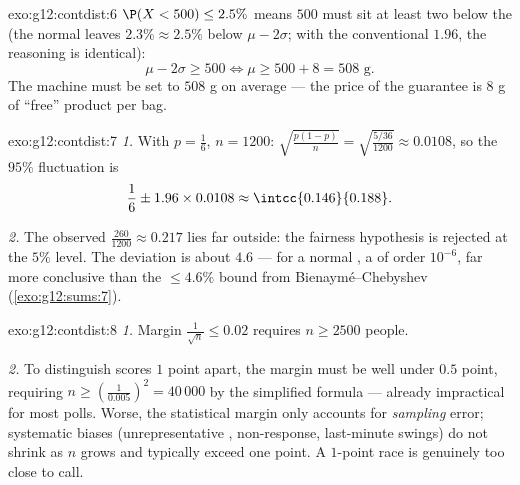 \begin{solution}{exo:g12:contdist:6}
$\P(X < 500) \leq 2.5\%$ means $500$ must sit at least two  below the  (the normal leaves $2.3\% \approx 2.5\%$ below
$\mu - 2\sigma$; with the conventional $1.96$, the reasoning is identical):
\[
\mu - 2\sigma \geq 500 \iff \mu \geq 500 + 8 = 508 \text{ g}.
\]
The machine must be set to $508$ g on average --- the price of the
guarantee is $8$ g of ``free'' product per bag.
\end{solution}

\begin{solution}{exo:g12:contdist:7}
\emph{1.} With $p = \frac16$, $n = 1200$:
$\sqrt{\frac{p(1-p)}{n}} = \sqrt{\frac{5/36}{1200}} \approx 0.0108$, so the
$95\%$ fluctuation  is
\[
\frac16 \pm 1.96 \times 0.0108 \approx \intcc{0.146}{0.188}.
\]

\emph{2.} The observed  $\frac{260}{1200} \approx 0.217$ lies far
outside: the fairness hypothesis is rejected at the $5\%$ level. The
deviation is about $4.6$  --- for a normal
, a  of order $10^{-6}$, far more conclusive than
the $\leq 4.6\%$ bound from Bienaymé--Chebyshev
(\cref{exo:g12:sums:7}).
\end{solution}

\begin{solution}{exo:g12:contdist:8}
\emph{1.} Margin $\frac{1}{\sqrt n} \leq 0.02$ requires
$n \geq 2500$ people.

\emph{2.} To distinguish scores $1$ point apart, the margin must be well
under $0.5$ point, requiring $n \geq \left(\frac{1}{0.005}\right)^2 =
40\,000$ by the simplified formula --- already impractical for most polls.
Worse, the statistical margin only accounts for \emph{sampling} error;
systematic biases (unrepresentative , non-response, last-minute
swings) do not shrink as $n$ grows and typically exceed one point. A
$1$-point race is genuinely too close to call.
\end{solution}


